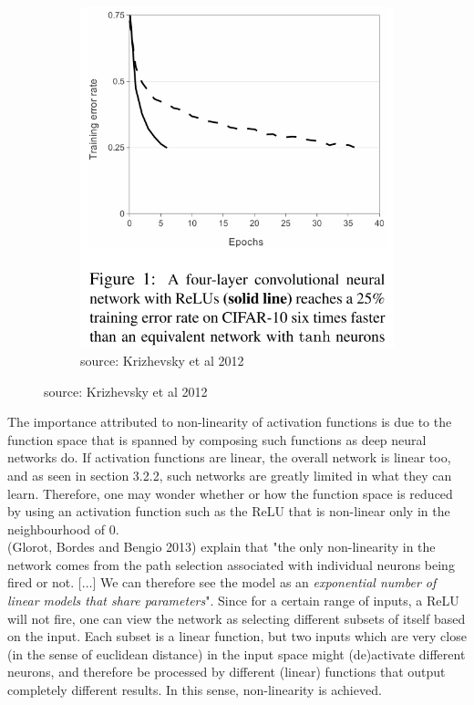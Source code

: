 \documentclass[a4paper,11pt]{article}
\begin{document}
\begin{figure}
\begin{minipage}[b]{\textwidth}
\begin{subfigure}{.5\textwidth}
        \includegraphics[scale=0.35]{images/ReLU_train_fast.png}
        \caption{source: Krizhevsky et al 2012}\label{fig:2b}
      \end{subfigure} \par \vspace*{20pt} %
    \end{minipage}%
\end{figure}

The importance attributed to non-linearity of activation functions is due to the function space that is spanned by composing such functions as deep neural networks do. If activation functions are linear, the overall network is linear too, and as seen in section 3.2.2, such networks are greatly limited in what they can learn. Therefore, one may wonder whether or how the function space is reduced by using an activation function such as the ReLU that is non-linear only in the neighbourhood of $0$.  \\

(Glorot, Bordes and Bengio 2013) \cite{rectifier} explain that "the only non-linearity in the network comes from the path selection associated with individual neurons being fired or not. [...] We can therefore see the model as an \textit{exponential number of linear models that share parameters}". Since for a certain range of inputs, a ReLU will not fire, one can view the network as selecting different subsets of itself based on the input. Each subset is a linear function, but two inputs which are very close (in the sense of euclidean distance) in the input space might (de)activate different neurons, and therefore be processed by different (linear) functions that output completely different results. In this sense, non-linearity is achieved. \\
\end{document}
